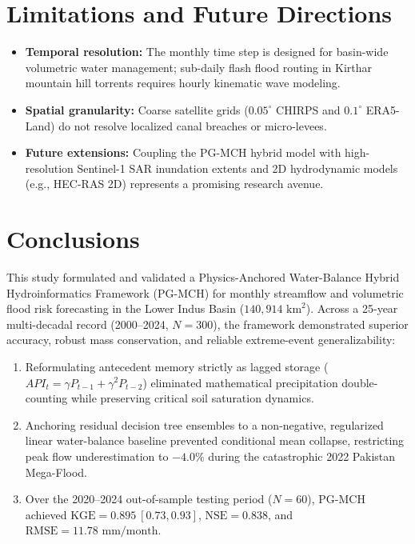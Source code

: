 \documentclass[11pt,a4paper,fleqn]{article}
\begin{document}
\section{Limitations and Future Directions}
\begin{itemize}
    \item \textbf{Temporal resolution:} The monthly time step is designed for basin-wide volumetric water management; sub-daily flash flood routing in Kirthar mountain hill torrents requires hourly kinematic wave modeling.
    \item \textbf{Spatial granularity:} Coarse satellite grids ($0.05^\circ$ CHIRPS and $0.1^\circ$ ERA5-Land) do not resolve localized canal breaches or micro-levees.
    \item \textbf{Future extensions:} Coupling the PG-MCH hybrid model with high-resolution Sentinel-1 SAR inundation extents \citep{tian2023satellite} and 2D hydrodynamic models (e.g., HEC-RAS 2D) represents a promising research avenue.
\end{itemize}

\section{Conclusions}
This study formulated and validated a Physics-Anchored Water-Balance Hybrid Hydroinformatics Framework (PG-MCH) for monthly streamflow and volumetric flood risk forecasting in the Lower Indus Basin ($140,914\text{ km}^2$). Across a 25-year multi-decadal record (2000--2024, $N=300$), the framework demonstrated superior accuracy, robust mass conservation, and reliable extreme-event generalizability:
\begin{enumerate}
    \item Reformulating antecedent memory strictly as lagged storage ($API_t = \gamma P_{t-1} + \gamma^2 P_{t-2}$) eliminated mathematical precipitation double-counting while preserving critical soil saturation dynamics.
    \item Anchoring residual decision tree ensembles to a non-negative, regularized linear water-balance baseline prevented conditional mean collapse, restricting peak flow underestimation to $-4.0\%$ during the catastrophic 2022 Pakistan Mega-Flood.
    \item Over the 2020--2024 out-of-sample testing period ($N=60$), PG-MCH achieved $\text{KGE} = 0.895\ [0.73, 0.93]$, $\text{NSE} = 0.838$, and $\text{RMSE} = 11.78\text{ mm/month}$.
\end{enumerate}
\end{document}
